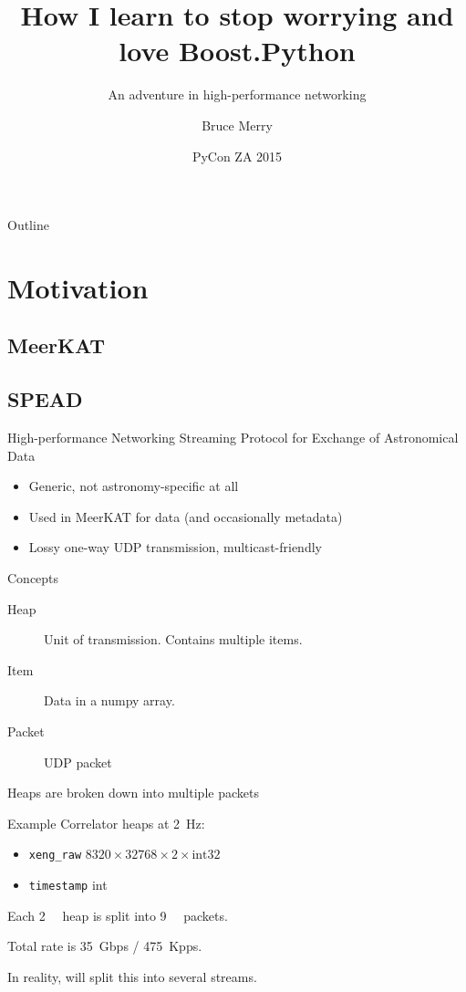 \documentclass{beamer}
\title[Boost.Python]{How I learn to stop worrying and love Boost.Python}
\subtitle{An adventure in high-performance networking}
\author{Bruce Merry}
\institute[SKA SA]{SKA South Africa}
\date{PyCon ZA 2015}
\begin{document}
\begin{frame}
  \titlepage
\end{frame}

\begin{frame}{Outline}
  \tableofcontents
\end{frame}

\section{Motivation}

\subsection{MeerKAT}

\subsection{SPEAD}

\begin{frame}{High-performance Networking}
  \alert{S}treaming \alert{P}rotocol for \alert{E}xchange of
  \alert{A}stronomical \alert{D}ata
  \begin{itemize}
    \item Generic, not astronomy-specific at all
    \item Used in MeerKAT for data (and occasionally metadata)
    \item Lossy one-way UDP transmission, multicast-friendly
  \end{itemize}
\end{frame}

\begin{frame}{Concepts}
  \begin{description}
    \item[Heap] Unit of transmission. Contains multiple items.
    \item[Item] Data in a numpy array.
    \item[Packet] UDP packet
  \end{description}
  Heaps are broken down into multiple packets
\end{frame}

\begin{frame}{Example}
  Correlator heaps at \SI{2}{\Hz}:
  \begin{itemize}
    \item \texttt{xeng_raw} $8320\times 32768\times 2\times \text{int32}$
    \item \texttt{timestamp} int
  \end{itemize}
  Each \SI{2}{\gibi\byte} heap is split into \SI{9}{\kilo\byte} packets.

  \pause
  Total rate is \SI{35}{Gbps} / \SI{475}{Kpps}.

  \pause
  In reality, will split this into several streams.
\end{frame}
\end{document}
